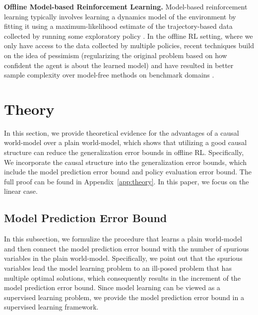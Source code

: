 \documentclass{article}
\theoremstyle{plain}
\theoremstyle{definition}
\theoremstyle{remark}
\begin{document}
\textbf{Offline Model-based Reinforcement Learning.}
Model-based reinforcement learning typically involves learning a dynamics model of the environment by fitting it using a maximum-likelihood estimate of the trajectory-based data collected by running some exploratory policy \cite{DBLP:conf/icra/WilliamsWGDRBT17,DBLP:conf/iclr/KurutachCDTA18}. 
In the offline RL setting, where we only have access to the data collected by multiple policies, recent techniques build on the idea of pessimism (regularizing the original problem based on how confident the agent is about the learned model) and have resulted in better sample complexity over model-free methods on benchmark domains \cite{DBLP:conf/nips/KidambiRNJ20,mopo}. 

\section{Theory}

In this section, we provide theoretical evidence for the advantages of a causal world-model over a plain world-model, which shows that utilizing a good causal structure can reduce the generalization error bounds in offline RL.
Specifically, We incorporate the causal structure into the generalization error bounds, which include the model prediction error bound and policy evaluation error bound.
The full proof can be found in Appendix~\ref{app:theory}.
In this paper, we focus on the linear case.



\subsection{Model Prediction Error Bound}

In this subsection, we formulize the procedure that learns a plain world-model and then connect the model prediction error bound with the number of spurious variables in the plain world-model.
Specifically, we point out that the spurious variables lead the model learning problem to an ill-posed problem that has multiple optimal solutions, which consequently results in the increment of the model prediction error bound.
Since model learning can be viewed as a supervised learning problem, we provide the model prediction error bound in a supervised learning framework.
\end{document}
